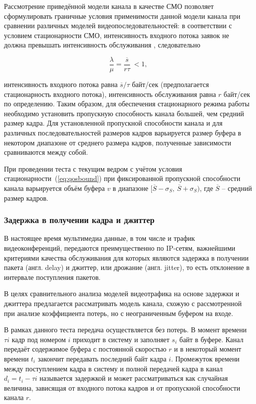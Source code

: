Рассмотрение приведённой модели канала в качестве СМО позволяет
сформулировать граничные условия применимости данной модели
канала при сравнении различных моделей видеопоследовательностей:
в соответствии с условием стационарности СМО, интенсивность
входного потока заявок не должна превышать интенсивность обслуживания
\cite{bertsekas},
следовательно

\begin{equation}
    \frac{\lambda}{\mu} = \frac{\overline{s}}{r\tau} \ < 1,
    \label{eq:qosbound}
\end{equation}

интенсивность входного потока равна $\overline{s}/\tau$ байт/сек
(предполагается стационарность входного потока),
интенсивность обслуживания равна $r$ байт/сек по определению.
Таким образом, для обеспечения стационарного режима работы необходимо
установить пропускную способность канала большей, чем средний размер
кадра. Для установленной пропускной способности канала и для различных
последовательностей размеров кадров варьируется размер буфера в некотором
диапазоне от среднего размера кадров, полученные зависимости
сравниваются между собой.

При проведении теста с текущим ведром с учётом условия стационарности~(\ref{eq:qosbound})
при фиксированной пропускной способности канала варьируется
объём буфера $v$ в диапазоне $[\overline{S} - \sigma_S,~\overline{S} + \sigma_S)$,
где $\overline{S}$ -- средний размер кадров.

\subsubsection{Задержка в получении кадра и джиттер}
\hspace{3pt}

В настоящее время мультимедиа данные, в том числе и трафик видеоконференций,
передаются преимущественно по IP-сетям, важнейшими критериями качества обслуживания
для которых
являются задержка в получении пакета (англ. delay) и джиттер, или дрожание
(англ. jitter), то есть отклонение в интервале поступления пакетов.

В целях сравнительного анализа моделей видеотрафика на основе задержки
и джиттера предлагается рассматривать модель канала, схожую с рассмотренной
при анализе коэффициента потерь, но с неограниченным буфером на входе.

В рамках данного теста передача осуществляется без потерь. В момент времени
$\tau i$ кадр под номером $i$ приходит в систему и заполняет $s_i$
байт в буфере. Канал передаёт содержимое буфера с постоянной скоростью
$r$ и в некоторый момент времени $t_i$ закончит передавать последний
байт кадра $i$. Промежуток времени между поступлением кадра в систему и полной
передачей кадра в канал $d_i = t_i - \tau i$ называется задержкой
и может рассматриваться как случайная величина, зависящая от
входного потока кадров и от пропускной способности канала $r$.

